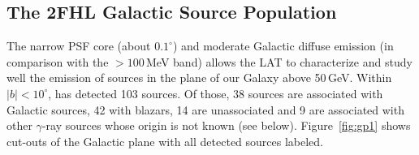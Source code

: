 {%
%
%

\subsection{The 2FHL Galactic Source Population}\label{2fhl:GalPop}


The narrow PSF core (about $0.1^{\circ}$) and moderate Galactic diffuse emission (in comparison with the $>100$\,MeV band) allows the LAT to characterize and study well the emission of sources in the plane of our Galaxy above 50\,GeV. Within $|b|<10^{\circ}$, \lat{} has detected 103 sources.
Of those, 38 sources are associated with Galactic sources, 42 with blazars, 14 are unassociated and 9 are associated with other $\gamma$-ray sources
whose origin is not known (see below).
Figure~\ref{fig:gp1} shows cut-outs of the Galactic plane with all detected sources labeled.

}
